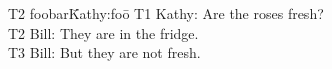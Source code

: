{\newpage
\clearpage
\samepage \begin{figure}[b]
\small{
\begin{tabbing}
T2 foobar\=Kathy:foo\= \kill
T1 \> Kathy: \> Are the roses fresh? \\ 
T2 \> Bill: \> They are in the fridge. \\ 
T3 \> Bill: \> But they are not fresh.
\end{tabbing}
}
\label{implic}
\end{figure}
}



